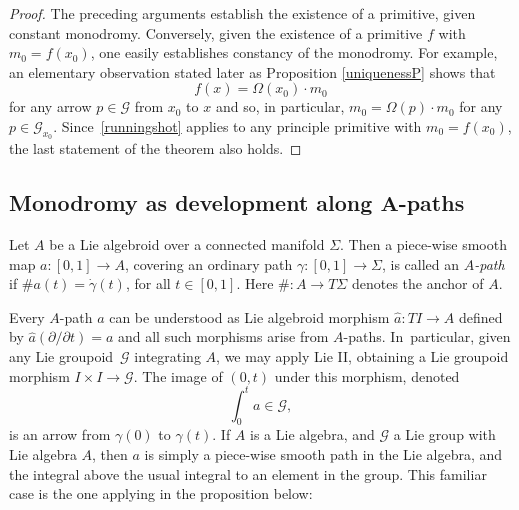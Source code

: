\documentclass[10pt,a4paper]{amsart}
\numberwithin{equation}{section}
\newcommand\integral{\int}
\begin{document}
\begin{proof}The preceding arguments establish the existence of a
primitive, given constant monodromy. Conversely, given the existence
of a primitive $f$ with $m_0=f(x_0)$, one easily establishes constancy
of the monodromy. For example, an elementary observation stated later
as Proposition \ref{uniquenessP} shows that
 \begin{equation}
 f(x) = \Omega (x_0)\cdot m_0\label{runningshot}
 \end{equation}
 for any arrow $p \in {\mathcal G} $ from $x_0$ to $x$ and so, in particular, $m_0=\Omega (p)\cdot m_0$ for any $p \in
{\mathcal G}_{x_0}$. Since~\eqref{runningshot} applies to any
principle primitive with $m_0=f(x_0)$, the last statement of the
theorem also holds.
\end{proof}


\subsection*{Monodromy as development along $\boldsymbol{A}$-paths}

Let $A$ be a Lie algebroid over a connected manifold $\Sigma $. Then a
piece-wise smooth map $a \colon [0,1] \allowbreak\rightarrow A$, covering an
ordinary path $\gamma \colon [0,1] \rightarrow \Sigma $, is called an
{\it $A$-path} if $\# a(t) = \dot \gamma(t)$, for all $t \in
[0,1]$. Here $\# \colon A \rightarrow T \Sigma $ denotes the anchor of
$A$.

Every $A$-path $a$ can be understood as Lie algebroid morphism $\hat a
\colon {T}I \rightarrow A$ defined by $\hat a (\partial/\partial t)=a$
and all such morphisms arise from $A$-paths. In~particular, given any
Lie groupoid~${\mathcal G} $ integrating $A$, we may apply Lie II,
obtaining a Lie groupoid morphism $I \times I \rightarrow {\mathcal G}
$. The image of $(0, t)$ under this morphism, denoted
\begin{equation*}
\integral_0^t a \in {\mathcal G},
\end{equation*} is an arrow from $\gamma(0)$ to $\gamma(t)$. If $A$ is
a Lie algebra, and ${\mathcal G} $ a Lie group with Lie algebra $A$, then
$a$ is simply a piece-wise smooth path in the Lie algebra, and the
integral above the usual integral to an element in the group. This
familiar case is the one applying in the proposition below:
\end{document}
